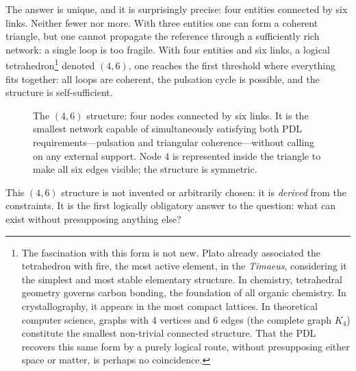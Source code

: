 \documentclass[12pt, a4paper, openright]{book}
\begin{document}
\medskip

The answer is unique, and it is surprisingly precise: four entities connected by six links. Neither fewer nor more. With three entities one can form a coherent triangle, but one cannot propagate the reference through a sufficiently rich network: a single loop is too fragile. With four entities and six links, a logical tetrahedron\footnote{The fascination with this form is not new. Plato already associated the tetrahedron with fire, the most active element, in the \textit{Timaeus}, considering it the simplest and most stable elementary structure. In chemistry, tetrahedral geometry governs carbon bonding, the foundation of all organic chemistry. In crystallography, it appears in the most compact lattices. In theoretical computer science, graphs with 4 vertices and 6 edges (the complete graph $K_4$) constitute the smallest non-trivial connected structure. That the PDL recovers this same form by a purely logical route, without presupposing either space or matter, is perhaps no coincidence.} denoted $(4,6)$, one reaches the first threshold where everything fits together: all loops are coherent, the pulsation cycle is possible, and the structure is self-sufficient.

\begin{figure}[h]
\centering
{}
\caption{\small The $(4,6)$ structure: four nodes connected by six links. It is the smallest network capable of simultaneously satisfying both PDL requirements---pulsation and triangular coherence---without calling on any external support. Node $4$ is represented inside the triangle to make all six edges visible; the structure is symmetric.}
\label{fig:46}
\end{figure}

\medskip

This $(4,6)$ structure is not invented or arbitrarily chosen: it is \emph{derived} from the constraints. It is the first logically obligatory answer to the question: what can exist without presupposing anything else?
\end{document}
